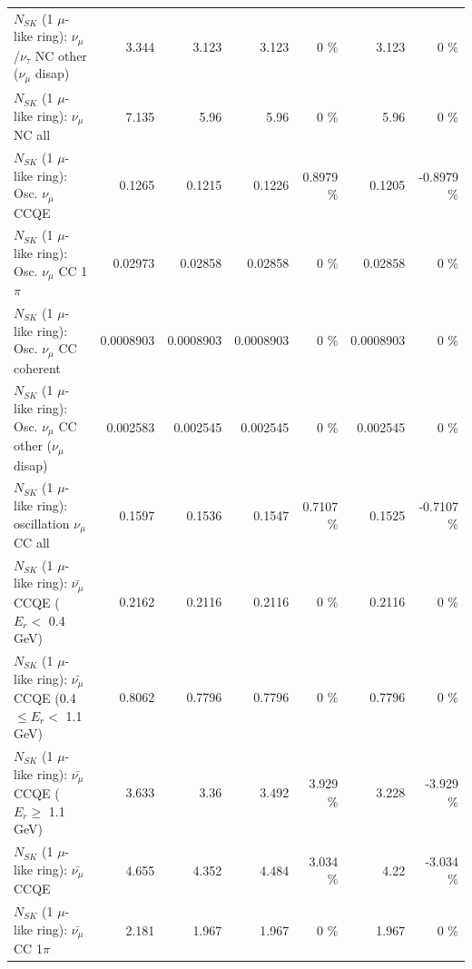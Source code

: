 \begin{table}
\begin{tabular}{| l | r | r | r  r | r  r |}
   $N_{SK}$ (1 $\mu$-like ring): $\nu_\mu$/$\nu_\tau$ NC other ($\nu_\mu$ disap) &           3.344 &           3.123 &           3.123 &        0 \%  &           3.123 &        0 \%  \\ 
                                $N_{SK}$ (1 $\mu$-like ring): $\nu_{\mu}$ NC all &           7.135 &            5.96 &            5.96 &        0 \%  &            5.96 &        0 \%  \\ 
\hline
\hline
                               $N_{SK}$ (1 $\mu$-like ring): Osc. $\nu_\mu$ CCQE &          0.1265 &          0.1215 &          0.1226 &   0.8979 \%  &          0.1205 &  -0.8979 \%  \\ 
                          $N_{SK}$ (1 $\mu$-like ring): Osc. $\nu_\mu$ CC 1$\pi$ &         0.02973 &         0.02858 &         0.02858 &        0 \%  &         0.02858 &        0 \%  \\ 
                        $N_{SK}$ (1 $\mu$-like ring): Osc. $\nu_\mu$ CC coherent &       0.0008903 &       0.0008903 &       0.0008903 &        0 \%  &       0.0008903 &        0 \%  \\ 
         $N_{SK}$ (1 $\mu$-like ring): Osc. $\nu_\mu$ CC other ($\nu_\mu$ disap) &        0.002583 &        0.002545 &        0.002545 &        0 \%  &        0.002545 &        0 \%  \\ 
                      $N_{SK}$ (1 $\mu$-like ring): oscillation $\nu_\mu$ CC all &          0.1597 &          0.1536 &          0.1547 &   0.7107 \%  &          0.1525 &  -0.7107 \%  \\ 
\hline
\hline
          $N_{SK}$ (1 $\mu$-like ring): $\bar{\nu_\mu}$ CCQE ($E_{r} <$ 0.4 GeV) &          0.2162 &          0.2116 &          0.2116 &        0 \%  &          0.2116 &        0 \%  \\ 
 $N_{SK}$ (1 $\mu$-like ring): $\bar{\nu_\mu}$ CCQE (0.4 $\leq E_{r} <$ 1.1 GeV) &          0.8062 &          0.7796 &          0.7796 &        0 \%  &          0.7796 &        0 \%  \\ 
       $N_{SK}$ (1 $\mu$-like ring): $\bar{\nu_\mu}$ CCQE ($E_{r} \geq$ 1.1 GeV) &           3.633 &            3.36 &           3.492 &    3.929 \%  &           3.228 &   -3.929 \%  \\ 
\hline
                              $N_{SK}$ (1 $\mu$-like ring): $\bar{\nu_\mu}$ CCQE &           4.655 &           4.352 &           4.484 &    3.034 \%  &            4.22 &   -3.034 \%  \\ 
                         $N_{SK}$ (1 $\mu$-like ring): $\bar{\nu_\mu}$ CC 1$\pi$ &           2.181 &           1.967 &           1.967 &        0 \%  &           1.967 &        0 \%  \\ 

\end{tabular}
\end{table}
